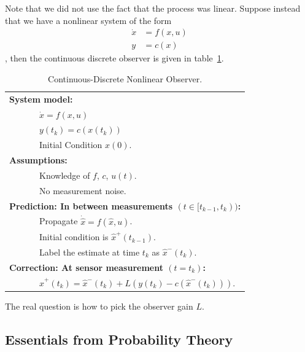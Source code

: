 {Note that we did not use the fact that the process was linear.
Suppose instead that we have a nonlinear system of the form
\begin{align}
\dot{x} &= f(x,u) \\
y &= c(x)
\end{align},
then the continuous discrete observer is given in
table~\ref{table:estimation_continuous-discrete-nonlinear}.
\begin{table}[hhhhtb]
\begin{center}
\begin{tabular}{l}
\hline
\textbf{System model:} \\
~~~~~~~$\dot{x}=f(x,u)$ \\
~~~~~~~$y(t_k)=c(x(t_k))$ \\
~~~~~~~Initial Condition $x(0)$. \\
\textbf{Assumptions:} \\
~~~~~~~Knowledge of $f$, $c$, $u(t)$. \\
~~~~~~~No measurement noise. \\
\textbf{Prediction: In between measurements $(t\in[t_{k-1}, t_k))$:} \\
~~~~~~~Propagate $\dot{\hat{x}}=f(\hat{x},u)$. \\
~~~~~~~Initial condition is $\hat{x}^+(t_{k-1}).$  \\
~~~~~~~Label the estimate at time $t_k$ as $\hat{x}^-(t_k)$.
\\
\textbf{Correction: At sensor measurement $(t=t_k)$:} \\
~~~~~~~$\hat{x}^+(t_k) = \hat{x}^-(t_k) + L\left( y(t_k) - c(\hat{x}^-(t_k)) \right).$ \\
\hline
\end{tabular}
\end{center}
\label{table:estimation_continuous-discrete-nonlinear}
\caption{Continuous-Discrete Nonlinear Observer.}
\end{table}

The real question is how to pick the observer gain $L$.


\subsection{Essentials from Probability Theory}

}
